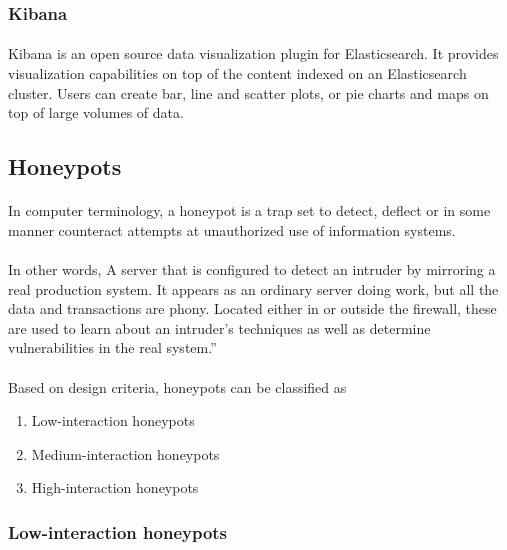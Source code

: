 \documentclass{report}
\begin{document}
\subsubsection{Kibana}

\paragraph{}
Kibana is an open source data visualization plugin for Elasticsearch. It provides visualization capabilities on top of the content indexed on an Elasticsearch cluster. Users can create bar, line and scatter plots, or pie charts and maps on top of large volumes of data.

\subsection{Honeypots}

\paragraph{}
In computer terminology, a honeypot is a trap set to detect, deflect or in some manner counteract attempts at unauthorized use of information systems.

\paragraph{}
In other words, A server that is configured to detect an intruder by mirroring a real production system. It appears as an ordinary server doing work, but all the data and transactions are phony. Located either in or outside the firewall, these are used to learn about an intruder’s techniques as well as determine vulnerabilities in the real system.”

\paragraph{}
Based on design criteria, honeypots can be classified as

\begin{enumerate}
\item Low-interaction honeypots
\item Medium-interaction honeypots
\item High-interaction honeypots
\end{enumerate}

\subsubsection{Low-interaction honeypots}
\end{document}
